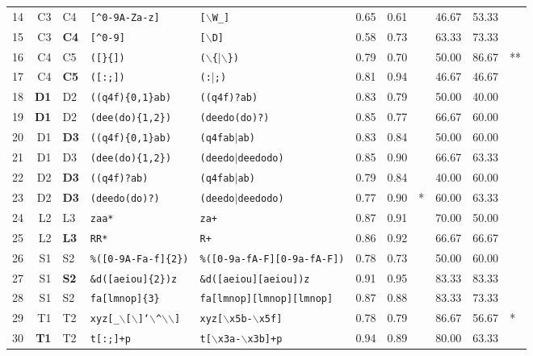 \begin{table*}[ht]
\begin{tabular}{rr@{ -- }lllrrlrrl}
  14 & C3 & C4 & {\tt [\verb|^|0-9A-Za-z]} & {\tt [$\backslash$W\_]} & 0.65 & 0.61 &   & 46.67 & 53.33 &   \\ 
  15 & C3 & {\bf C4} & {\tt [\verb|^|0-9]} & {\tt [$\backslash$D]} & 0.58 & 0.73 &   & 63.33 & 73.33 &   \\ 
  16 & C4 & C5 & {\tt ([\}\{])} & {\tt ($\backslash$\{$|$$\backslash$\})} & 0.79 & 0.70 &   & 50.00 & 86.67 & ** \\ 
  17 & C4 & {\bf C5} & {\tt ([:;])} & {\tt (:$|$;)} & 0.81 & 0.94 &   & 46.67 & 46.67 &   \\ 
  \hline
  18 & {\bf D1} & D2 & {\tt ((q4f)\{0,1\}ab)} & {\tt ((q4f)?ab)} & 0.83 & 0.79 &   & 50.00 & 40.00 &   \\ 
  19 & {\bf D1} & D2 & {\tt (dee(do)\{1,2\})} & {\tt (deedo(do)?)} & 0.85 & 0.77 &   & 66.67 & 60.00 &   \\ 
  20 & D1 & {\bf D3} & {\tt ((q4f)\{0,1\}ab)} & {\tt (q4fab$|$ab)} & 0.83 & 0.84 &   & 50.00 & 60.00 &   \\ 
  21 & D1 & D3 & {\tt (dee(do)\{1,2\})} & {\tt (deedo$|$deedodo)} & 0.85 & 0.90 &   & 66.67 & 63.33 &   \\ 

  22 & D2 & {\bf D3} & {\tt ((q4f)?ab)} & {\tt (q4fab$|$ab)} & 0.79 & 0.84 &   & 40.00 & 60.00 &   \\ 
  23 & D2 & {\bf D3} & {\tt (deedo(do)?)} & {\tt (deedo$|$deedodo)} & 0.77 & 0.90 & * & 60.00 & 63.33 &   \\ 
  \hline
  24 & L2 & L3 & {\tt zaa*} & {\tt za+} & 0.87 & 0.91 &   & 70.00 & 50.00 &   \\ 
  25 & L2 & {\bf L3} & {\tt RR*} & {\tt R+} & 0.86 & 0.92 &   & 66.67 & 66.67 &   \\ 
  \hline
  26 & S1 & S2 & {\tt \%([0-9A-Fa-f]\{2\})} & {\tt \%([0-9a-fA-F][0-9a-fA-F])} & 0.78 & 0.73 &   & 50.00 & 60.00 &   \\ 
  27 & S1 & {\bf S2} & {\tt \&d([aeiou]\{2\})z} & {\tt \&d([aeiou][aeiou])z} & 0.91 & 0.95 &   & 83.33 & 83.33 &   \\ 
  28 & S1 & S2 & {\tt fa[lmnop]\{3\}} & {\tt fa[lmnop][lmnop][lmnop]} & 0.87 & 0.88 &   & 83.33 & 73.33 &   \\ 
  \hline
  29 & T1 & T2 & {\tt xyz[\_$\backslash$[$\backslash$]`$\backslash$\verb|^|$\backslash$$\backslash$]} & {\tt xyz[$\backslash$x5b-$\backslash$x5f]} & 0.78 & 0.79 &   & 86.67 & 56.67 & * \\ 
  30 & {\bf T1} & T2 & {\tt t[:;]+p} & {\tt t[$\backslash$x3a-$\backslash$x3b]+p} & 0.94 & 0.89 &   & 80.00 & 63.33 &   \\ 
  

\end{tabular}
\end{table*}
